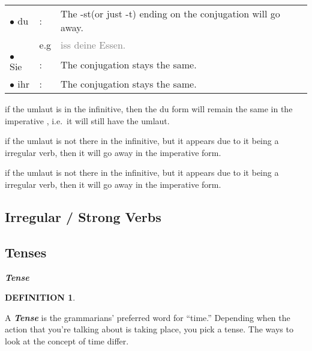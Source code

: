 \documentclass[a4paper,twocolumn,10pt]{article}
\newtheorem{mydef}{DEFINITION}[section]
\newcommand{\subsectionend}
{
\nolinenumbers
\linenumbers
}
\newcommand{\bulletpoint}
{ $\bullet$  }
\newcommand{\tcolorboxstart}
{
	\nolinenumbers
	\vspace{0.2cm}
	\centering
}
\newcommand{\tcolorboxend}
{
	\justifying
	\vspace{0.2cm}
	\linenumbers
}
\newcommand{\tcolorboxdefinition}[3]
{

\tcolorboxstart
\begin{defn-bg}

	\begin{defn-title}[width=7cm]{}
	{
		\normalsize \textbf{\textit{#1}}
	}
	\end{defn-title}

	\begin{defn-theword}
	{
		\footnotesize
		\begin{mydef} #2
		\end{mydef}
	}
	\end{defn-theword}


	\begin{defn-content}

	\justify
	#3

	\end{defn-content}

\end{defn-bg}
\tcolorboxend
}
\begin{document}

\nolinenumbers

\vspace{0.5cm}

\begin{tabularx}{0.95\linewidth}{llX}

\rowcolor{white} \bulletpoint du  & : & The -st(or just -t) ending on the conjugation will
go away.  \\

\rowcolor{white} & e.g  & \textcolor{gray}{iss deine Essen.}\\
\rowcolor{white} \bulletpoint Sie & : & The conjugation stays the same. \\
\rowcolor{white} \bulletpoint ihr & : & The conjugation stays the same. \\

\end{tabularx}

\vspace{0.5cm}

\linenumbers


if the umlaut is in the infinitive, then the du form will remain the same in the
imperative , i.e.\ it will still have the umlaut.\

if the umlaut is not there in the infinitive, but it appears due to it being a
irregular verb, then it will go away in the imperative form.\

if the umlaut is not there in the infinitive, but it appears due to it being a
irregular verb, then it will go away in the imperative form.\


\subsectionend

\subsection{Irregular / Strong Verbs}
\label{ssec:irregular_verbs}




\subsectionend

\subsection{Tenses}
\label{ssec:tenses}

\tcolorboxdefinition
{Tense}
{\label{def:tense}}
{

A \textbf{\textit{Tense}} is the grammarians’ preferred word for “time.”
Depending when the action that you’re talking about is taking place, you pick a
tense. The ways to look at the concept of time differ.

}
\end{document}
